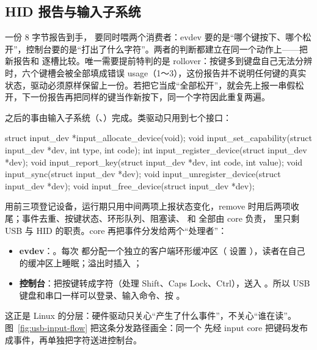 \subsection{HID 报告与输入子系统}
\label{sec:usb-input}

一份 8 字节报告到手， 要同时喂两个消费者：evdev 要的是“哪个键按下、哪个松开”，控制台要的是“打出了什么字符”。两者的判断都建立在同一个动作上——把新报告和  逐槽比较。唯一需要提前特判的是 rollover：按键多到键盘自己无法分辨时，六个键槽会被全部填成错误 usage（1～3），这份报告并不说明任何键的真实状态，驱动必须原样保留上一份。若把它当成“全部松开”，就会先上报一串假松开，下一份报告再把同样的键当作新按下，同一个字符因此重复两遍。

之后的事由输入子系统（、）完成。类驱动只用到七个接口：

\begin{ccode}
struct input_dev *input_allocate_device(void);
void input_set_capability(struct input_dev *dev, int type, int code);
int  input_register_device(struct input_dev *dev);
void input_report_key(struct input_dev *dev, int code, int value);
void input_sync(struct input_dev *dev);
void input_unregister_device(struct input_dev *dev);
void input_free_device(struct input_dev *dev);
\end{ccode}

 用前三项登记设备，运行期只用中间两项上报状态变化，remove 时用后两项收尾；事件去重、按键状态、环形队列、阻塞读、 和  全部由 core 负责， 里只剩 USB 与 HID 的职责。core 再把事件分发给两个“处理者”：

\begin{itemize}
  \item \textbf{evdev}：。每次  都分配一个独立的客户端环形缓冲区（ 设置 ），读者在自己的缓冲区上睡眠；溢出时插入 ；
  \item \textbf{控制台}：把按键转成字符（处理 Shift、Caps Lock、Ctrl），送入 。所以 USB 键盘和串口一样可以登录、输入命令、按 。
\end{itemize}

这正是 Linux 的分层：硬件驱动只关心“产生了什么事件”，不关心“谁在读”。图~\ref{fig:usb-input-flow} 把这条分发路径画全：同一个  先经 input core 把键码发布成事件，再单独把字符送进控制台。

